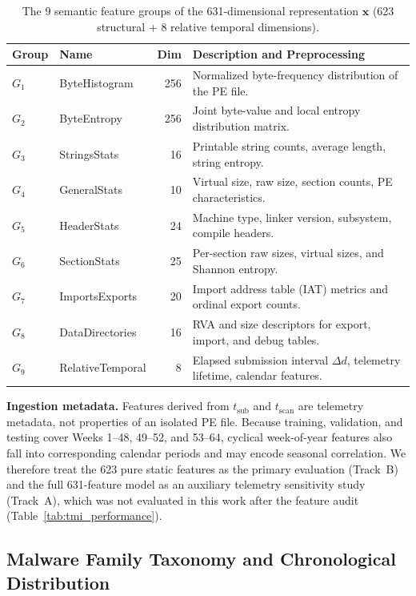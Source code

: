 \documentclass[Number]{sn-jnl}
\begin{document}
\begin{table}[htbp]
\caption{The 9 semantic feature groups of the 631-dimensional representation $\mathbf{x}$ (623 structural + 8 relative temporal dimensions).}\label{tab:feature_groups}
\centering\footnotesize
\setlength{\tabcolsep}{4pt}
\begin{tabularx}{\linewidth}{@{}llr>{\raggedright\arraybackslash}X@{}}
\toprule
\textbf{Group} & \textbf{Name} & \textbf{Dim} & \textbf{Description and Preprocessing} \\
\midrule
$G_1$ & ByteHistogram    & 256 & Normalized byte-frequency distribution of the PE file. \\
$G_2$ & ByteEntropy      & 256 & Joint byte-value and local entropy distribution matrix. \\
$G_3$ & StringsStats     & 16  & Printable string counts, average length, string entropy. \\
$G_4$ & GeneralStats     & 10  & Virtual size, raw size, section counts, PE characteristics. \\
$G_5$ & HeaderStats      & 24  & Machine type, linker version, subsystem, compile headers. \\
$G_6$ & SectionStats     & 25  & Per-section raw sizes, virtual sizes, and Shannon entropy. \\
$G_7$ & ImportsExports   & 20  & Import address table (IAT) metrics and ordinal export counts. \\
$G_8$ & DataDirectories  & 16  & RVA and size descriptors for export, import, and debug tables. \\
$G_9$ & RelativeTemporal & 8   & Elapsed submission interval $\Delta d$, telemetry lifetime, calendar features. \\
\bottomrule
\end{tabularx}
\end{table}

\noindent\textbf{Ingestion metadata.}
Features derived from $t_\text{sub}$ and $t_\text{scan}$ are telemetry metadata, not properties of an isolated PE file. Because training, validation, and testing cover Weeks 1--48, 49--52, and 53--64, cyclical week-of-year features also fall into corresponding calendar periods and may encode seasonal correlation. We therefore treat the 623 pure static features as the primary evaluation (Track~B) and the full 631-feature model as an auxiliary telemetry sensitivity study (Track~A), which was not evaluated in this work after the feature audit (Table~\ref{tab:tmi_performance}).

\subsection{Malware Family Taxonomy and Chronological Distribution}\label{subsec:taxonomy}
\end{document}
